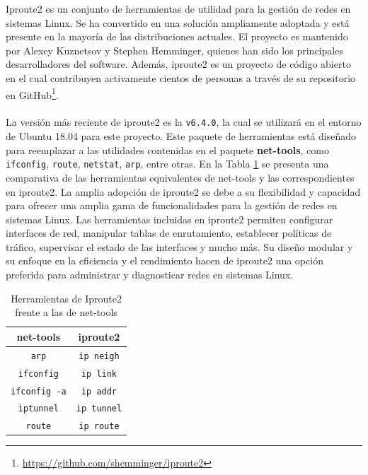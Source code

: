 Iproute2 es un conjunto de herramientas de utilidad para la gestión de redes en sistemas Linux. Se ha convertido en una solución ampliamente adoptada y está presente en la mayoría de las distribuciones actuales. El proyecto es mantenido por Alexey Kuznetsov y Stephen Hemminger, quienes han sido los principales desarrolladores del software. Además, iproute2 es un proyecto de código abierto en el cual contribuyen activamente cientos de personas a través de su repositorio en GitHub\footnote{\url{https://github.com/shemminger/iproute2}}.\\
\\
La versión más reciente de iproute2 es la \texttt{v6.4.0}, la cual se utilizará en el entorno de Ubuntu 18.04 para este proyecto. Este paquete de herramientas está diseñado para reemplazar a las utilidades contenidas en el paquete \textbf{net-tools}, como \texttt{ifconfig}, \texttt{route}, \texttt{netstat}, \texttt{arp}, entre otras. En la Tabla \ref{tab:ipNettools} se presenta una comparativa de las herramientas equivalentes de net-tools y las correspondientes en iproute2. La amplia adopción de iproute2 se debe a su flexibilidad y capacidad para ofrecer una amplia gama de funcionalidades para la gestión de redes en sistemas Linux. Las herramientas incluidas en iproute2 permiten configurar interfaces de red, manipular tablas de enrutamiento, establecer políticas de tráfico, supervisar el estado de las interfaces y mucho más. Su diseño modular y su enfoque en la eficiencia y el rendimiento hacen de iproute2 una opción preferida para administrar y diagnosticar redes en sistemas Linux.

\begin{table}[ht!]
    \centering
    \begin{tabular}{|c|c|}
        \hline
        \rowcolor[HTML]{C0C0C0}
        {\color[HTML]{000000} \textbf{net-tools}} & {\color[HTML]{000000} \textbf{iproute2}} \\ \hline
        \texttt{arp}                              & \texttt{ip neigh}                        \\ \hline
        \texttt{ifconfig}                         & \texttt{ip link}                         \\ \hline
        \texttt{ifconfig -a}                      & \texttt{ip addr}                         \\ \hline
        \texttt{iptunnel}                         & \texttt{ip tunnel}                       \\ \hline
        \texttt{route}                            & \texttt{ip route}                        \\ \hline
    \end{tabular}
    \caption{Herramientas de Iproute2 frente a las de net-tools}
    \label{tab:ipNettools}
\end{table}

